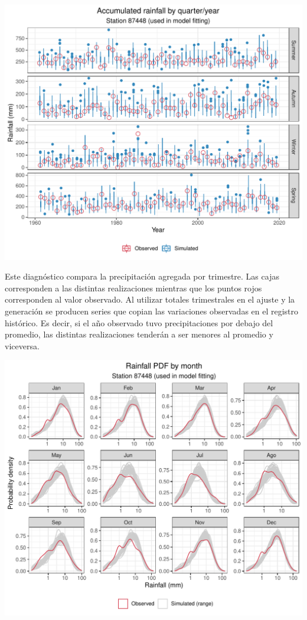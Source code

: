 \documentclass[
]{article}
\begin{document}
\begin{center}\includegraphics{Webinario_Generador_files/figure-latex/unnamed-chunk-36-1} \end{center}

Este diagnóstico compara la precipitación agregada por trimestre. Las cajas corresponden a las distintas realizaciones mientras que los puntos rojos corresponden al valor observado. Al utilizar totales trimestrales en el ajuste y la generación se producen series que copian las variaciones observadas en el registro histórico. Es decir, si el año observado tuvo precipitaciones por debajo del promedio, las distintas realizaciones tenderán a ser menores al promedio y viceversa.

\begin{center}\includegraphics{Webinario_Generador_files/figure-latex/unnamed-chunk-37-1} \end{center}
\end{document}
